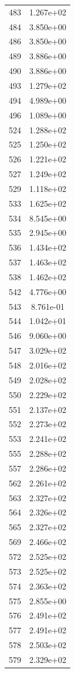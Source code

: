 \documentclass[12pt]{article}
\begin{document}
\begin{longtable}{@{}cc@{}}
483 & 1.267e+02 \\
484 & 3.850e+00 \\
486 & 3.850e+00 \\
489 & 3.886e+00 \\
490 & 3.886e+00 \\
493 & 1.279e+02 \\
494 & 4.989e+00 \\
496 & 1.089e+00 \\
524 & 1.288e+02 \\
525 & 1.250e+02 \\
526 & 1.221e+02 \\
527 & 1.249e+02 \\
529 & 1.118e+02 \\
533 & 1.625e+02 \\
534 & 8.545e+00 \\
535 & 2.945e+00 \\
536 & 1.434e+02 \\
537 & 1.463e+02 \\
538 & 1.462e+02 \\
542 & 4.776e+00 \\
543 & 8.761e-01 \\
544 & 1.042e+01 \\
546 & 9.060e+00 \\
547 & 3.029e+02 \\
548 & 2.016e+02 \\
549 & 2.028e+02 \\
550 & 2.229e+02 \\
551 & 2.137e+02 \\
552 & 2.273e+02 \\
553 & 2.241e+02 \\
555 & 2.288e+02 \\
557 & 2.286e+02 \\
562 & 2.261e+02 \\
563 & 2.327e+02 \\
564 & 2.326e+02 \\
565 & 2.327e+02 \\
569 & 2.466e+02 \\
572 & 2.525e+02 \\
573 & 2.525e+02 \\
574 & 2.363e+02 \\
575 & 2.855e+00 \\
576 & 2.491e+02 \\
577 & 2.491e+02 \\
578 & 2.503e+02 \\
579 & 2.329e+02 \\

\end{longtable}
\end{document}
